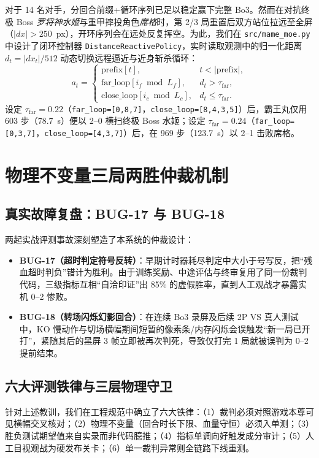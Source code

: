 \documentclass[10pt,twocolumn]{article}
\begin{document}
对于 14 名对手，分回合前缀+循环序列已足以稳定赢下完整 Bo3。然而在对抗终极 Boss \textit{罗将神水姬}与重甲摔投角色\textit{席格}时，第 2/3 局重置后双方站位拉远至全屏（$|dx| > 250$~px），开环序列会在远处反复挥空。为此，我们在 \texttt{src/mame\_moe.py} 中设计了闭环控制器 \texttt{DistanceReactivePolicy}，实时读取观测中的归一化距离 $d_t = |dx_t|/512$ 动态切换远程逼近与近身斩杀循环：
\begin{equation}
a_t = \begin{cases}
\text{prefix}[t], & t < |\text{prefix}|, \\
\text{far\_loop}[i_f \bmod L_f], & d_t > \tau_{\text{far}}, \\
\text{close\_loop}[i_c \bmod L_c], & d_t \le \tau_{\text{far}}.
\end{cases}
\end{equation}
设定 $\tau_{\text{far}} = 0.22$（\texttt{far\_loop=[0,8,7]}，\texttt{close\_loop=[8,4,3,5]}）后，霸王丸仅用 603 步（78.7~s）便以 2--0 横扫终极 Boss 水姬；设定 $\tau_{\text{far}} = 0.24$（\texttt{far\_loop=[0,3,7]}，\texttt{close\_loop=[4,3,7]}）后，在 969 步（123.7~s）以 2--1 击败席格。

\section{物理不变量三局两胜仲裁机制}
\subsection{真实故障复盘：BUG-17 与 BUG-18}
两起实战评测事故深刻塑造了本系统的仲裁设计：
\begin{itemize}
    \item \textbf{BUG-17（超时判定符号反转）}：早期计时器耗尽判定中大小于号写反，把“残血超时判负”错计为胜利。由于训练奖励、中途评估与终审复用了同一份裁判代码，三级指标互相“自洽印证”出 85\% 的虚假胜率，直到人工观战才暴露实机 0--2 惨败。
    \item \textbf{BUG-18（转场闪烁幻影回合）}：在连续 Bo3 录屏及后续 2P VS 真人测试中，KO 慢动作与切场横幅期间短暂的像素条/内存闪烁会误触发“新一局已开打”，紧随其后的黑屏 3 帧立即被再次判死，导致仅打完 1 局就被误判为 0--2 提前结束。
\end{itemize}

\subsection{六大评测铁律与三层物理守卫}
针对上述教训，我们在工程规范中确立了六大铁律：（1）裁判必须对照游戏本尊可见横幅交叉核对；（2）物理不变量（回合时长下限、血量守恒）必须入单测；（3）胜负测试期望值来自实录而非代码臆推；（4）指标单调向好触发成分审计；（5）人工目视观战为硬发布关卡；（6）单一裁判异常则全链路下线重测。
\end{document}
